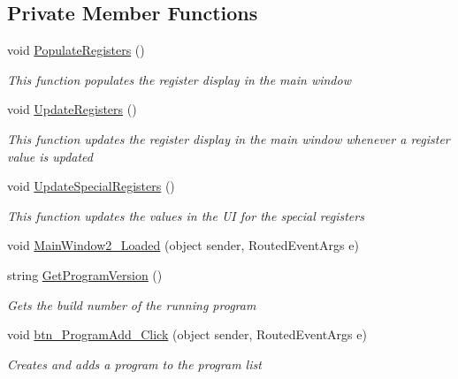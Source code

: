 \subsection*{Private Member Functions}
\begin{DoxyCompactItemize}
\item 
void \hyperlink{class_c_p_u___o_s___simulator_1_1_main_window_a06b2ba04e8c006037cae7b0e40b9c5a0}{Populate\+Registers} ()
\begin{DoxyCompactList}\small\item\em This function populates the register display in the main window \end{DoxyCompactList}\item 
void \hyperlink{class_c_p_u___o_s___simulator_1_1_main_window_a4fbca2d50698a847da4ab82c3f380680}{Update\+Registers} ()
\begin{DoxyCompactList}\small\item\em This function updates the register display in the main window whenever a register value is updated \end{DoxyCompactList}\item 
void \hyperlink{class_c_p_u___o_s___simulator_1_1_main_window_a798838ad3fae6117c8e624047a591931}{Update\+Special\+Registers} ()
\begin{DoxyCompactList}\small\item\em This function updates the values in the U\+I for the special registers \end{DoxyCompactList}\item 
void \hyperlink{class_c_p_u___o_s___simulator_1_1_main_window_a3b945b691332686989cd5b5107f7f98b}{Main\+Window2\+\_\+\+Loaded} (object sender, Routed\+Event\+Args e)
\item 
string \hyperlink{class_c_p_u___o_s___simulator_1_1_main_window_a99cb5e507849facbb9f5f271736759f7}{Get\+Program\+Version} ()
\begin{DoxyCompactList}\small\item\em Gets the build number of the running program \end{DoxyCompactList}\item 
void \hyperlink{class_c_p_u___o_s___simulator_1_1_main_window_abe3e79941789134ce080390fcafc720e}{btn\+\_\+\+Program\+Add\+\_\+\+Click} (object sender, Routed\+Event\+Args e)
\begin{DoxyCompactList}\small\item\em Creates and adds a program to the program list \end{DoxyCompactList}\item 

\end{DoxyCompactItemize}
